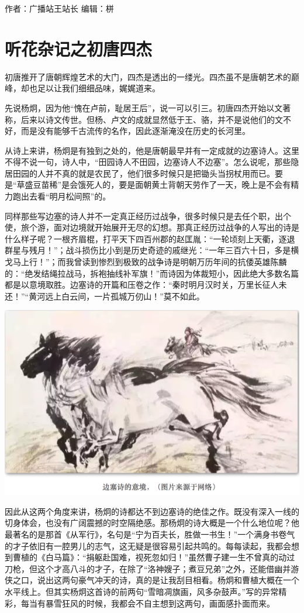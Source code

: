 \documentclass[]{book}
\begin{document}
作者：广播站王站长 编辑：栟

\section{听花杂记之初唐四杰}

初唐推开了唐朝辉煌艺术的大门，四杰是透出的一缕光。四杰虽不是唐朝艺术的巅峰，却也足以让我们细细品味，娓娓道来。

先说杨炯，因为他``愧在卢前，耻居王后''，说一可以引三。初唐四杰开始以文著称，后来以诗文传世。但杨、卢文的成就显然低于王、骆，并不是说他们的文不好，而是没有能够千古流传的名作，因此逐渐淹没在历史的长河里。

从诗上来讲，杨炯是有独到之处的，他是唐朝最早并有一定成就的边塞诗人。这里不得不说一句，诗人中，``田园诗人不田园，边塞诗人不边塞''。怎么说呢，那些隐居田园的人并不真的就是农民了，他们很多时候只是把锄头当拐杖用而已。要是``草盛豆苗稀''是会饿死人的，要是面朝黄土背朝天劳作了一天，晚上是不会有精力跑出去看``明月松间照''的。

同样那些写边塞的诗人并不一定真正经历过战争，很多时候只是去任个职，出个使，旅个游，面对边境就开始展开无尽的幻想。那真正经历过战争的人写出的诗是什么样子呢？一根齐眉棍，打平天下四百州郡的赵匡胤：``一轮顷刻上天衢，逐退群星与残月！''；战斗损伤比小到是历史奇迹的戚继光：``一年三百六十日，多是横戈马上行！''；而我曾读到惨烈到极致的战争诗是明朝万历年间的抗倭英雄陈麟的：``绝发结绳拉战马，拆袍抽线补军旗！''而诗因为体裁短小，因此绝大多数名篇都是以意境取胜。边塞诗的开篇和压卷之作：``秦时明月汉时关，万里长征人未还！''``黄河远上白云间，一片孤城万仞山！''莫不如此。

\includegraphics[width=8.33in]{images/ctsj1}

因此从这两个角度来讲，杨炯的诗都达不到边塞诗的绝佳之作。既没有深入一线的切身体会，也没有广阔震撼的时空隔绝感。那杨炯的诗大概是一个什么地位呢？他最著名的是那首《从军行》，名句是``宁为百夫长，胜做一书生！''一个满身书卷气的才子依旧有一腔男儿的志气，这无疑是很容易引起共鸣的。每每读起，我都会想到曹植的《白马篇》：``捐躯赴国难，视死忽如归！''虽然曹子建一生不曾真的动过刀枪，但这个才高八斗的才子，在除了``洛神嫂子；煮豆兄弟''之外，还能借幽并游侠之口，说出这两句豪气冲天的诗，真的是让我刮目相看。杨炯和曹植大概在一个水平线上。但其实杨炯这首诗的前两句``雪暗凋旗画，风多杂鼓声。''写的异常精彩，每当有暴雪狂风的时候，我都会不自主想到这两句，画面感扑面而来。
\end{document}
